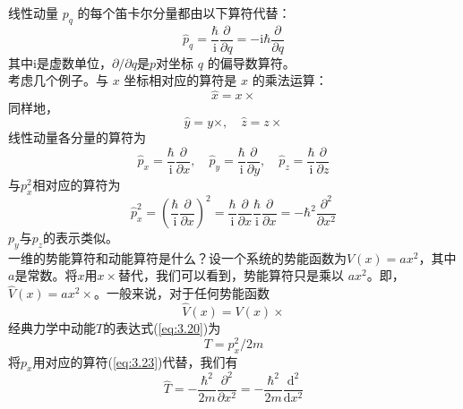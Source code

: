 	线性动量 $p_q$ 的每个笛卡尔分量都由以下算符代替：
	\begin{equation*}
		\hat{p}_q = \frac{\hbar}{\mathrm{i}}\frac{\partial}{\partial q} = -\mathrm{i}\hbar\frac{\partial}{\partial q}
	\end{equation*}	
	其中$\mathrm{i}$是虚数单位，$\partial / \partial q$是$p$对坐标 $q$ 的偏导数算符。\\
	\indent 考虑几个例子。与 $x$ 坐标相对应的算符是 $x$ 的乘法运算：
	\begin{equation}
		\boxed{
			\hat{x} = x \times
		}
		\label{eq:3.21}
	\end{equation}
	同样地，
	\begin{equation}
		\boxed{
			\hat{y} = y \times, \quad \hat{z} = z \times
		}
		\label{eq:3.22}
	\end{equation}
	线性动量各分量的算符为
	\begin{equation}
		\boxed{
			\hat{p}_x = \frac{\hbar}{\mathrm{i}}\frac{\partial}{\partial x}, \quad \hat{p}_y = \frac{\hbar}{\mathrm{i}}\frac{\partial}{\partial y}, \quad \hat{p}_z = \frac{\hbar}{\mathrm{i}}\frac{\partial}{\partial z}
		}
		\label{eq:3.23}
	\end{equation}
	与$p_x^2$相对应的算符为
	\begin{equation}
		\hat{p}_x^2 = \left(\frac{\hbar}{\mathrm{i}} \frac{\partial}{\partial x}\right)^2 = \frac{\hbar}{\mathrm{i}} \frac{\partial}{\partial x}\frac{\hbar}{\mathrm{i}} \frac{\partial}{\partial x} = -\hbar^2 \frac{\partial^2}{\partial x^2}
		\label{eq:3.24}
	\end{equation}
	$p_y$与$p_z$的表示类似。\\
	\indent 一维的势能算符和动能算符是什么？设一个系统的势能函数为$V\left(x\right) = ax^2$，其中$a$是常数。将$x$用$x \times$替代，我们可以看到，势能算符只是乘以 $ax^2$。即，$\hat{V}\left(x\right) = ax^2 \times$。一般来说，对于任何势能函数
	\begin{equation}
		\boxed{
			\hat{V}\left(x\right) = V\left(x\right) \times 
		}
		\label{eq:3.25 definition of potential energy operator}
	\end{equation}
	经典力学中动能$T$的表达式(\ref{eq:3.20})为
	\begin{equation}
		\boxed{
			T = p_x^2 / 2m
		}
		\label{eq:3.26}
	\end{equation}
	将$p_x$用对应的算符(\ref{eq:3.23})代替，我们有
	\begin{equation}
		\hat{T} = -\frac{\hbar^2}{2m}\frac{\partial^2}{\partial x^2} = -\frac{\hbar^2}{2m}\frac{\mathrm{d}^2}{\mathrm{d}x^2}
	\end{equation}
